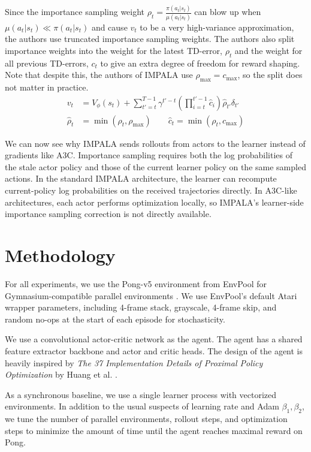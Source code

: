 \documentclass{article}
\begin{document}
Since the importance sampling weight $\rho_t = \frac{\pi(a_t|s_t)}{\mu(a_t|s_t)}$ can blow up when
$\mu(a_t|s_t) \ll \pi(a_t|s_t)$ and cause $v_t$ to be a very high-variance approximation, the authors use
truncated importance sampling weights. The authors also split importance weights into the weight for the
latest TD-error, $\rho_t$ and the weight for all previous TD-errors, $c_t$ to give an extra degree of
freedom for reward shaping. Note that despite this, the authors of IMPALA use $\rho_{\max} = c_{\max}$, so
the split does not matter in practice.
\begin{align*}
v_t &= V_\phi(s_t) + \sum_{t'=t}^{T-1} \gamma^{t'-t}
\left( \prod_{i=t}^{t'-1} \hat{c}_i \right)
\hat{\rho}_{t'} \delta_{t'} \\
\hat{\rho}_t &= \min(\rho_t, \rho_{\max}) \qquad \hat{c}_t = \min(\rho_t, c_{\max})
\end{align*}

We can now see why IMPALA sends rollouts from actors to the learner instead of gradients like A3C.
Importance sampling requires both the log probabilities of the stale actor policy and those of the current
learner policy on the same sampled actions. In the standard IMPALA architecture, the learner can recompute
current-policy log probabilities on the received trajectories directly. In A3C-like architectures,
each actor performs optimization locally, so IMPALA's learner-side importance sampling correction is not
directly available.


\section{Methodology}
For all experiments, we use the Pong-v5 environment from EnvPool for Gymnasium-compatible parallel
environments \cite{weng2022envpool}. We use EnvPool's default Atari wrapper parameters, including 4-frame
stack, grayscale, 4-frame skip, and random no-ops at the start of each episode for stochasticity.

We use a convolutional actor-critic network as the agent. The agent has a shared feature extractor backbone
and actor and critic heads. The design of the agent is heavily inspired by \emph{The 37 Implementation Details of Proximal Policy
Optimization} by Huang et al. \cite{huang2022ppo37}.

As a synchronous baseline, we use a single learner process with vectorized environments. In addition to the
usual suspects of learning rate and Adam $\beta_1, \beta_2$, we tune the number of parallel environments,
rollout steps, and optimization steps to minimize the amount of time until the agent reaches maximal reward
on Pong.
\end{document}
